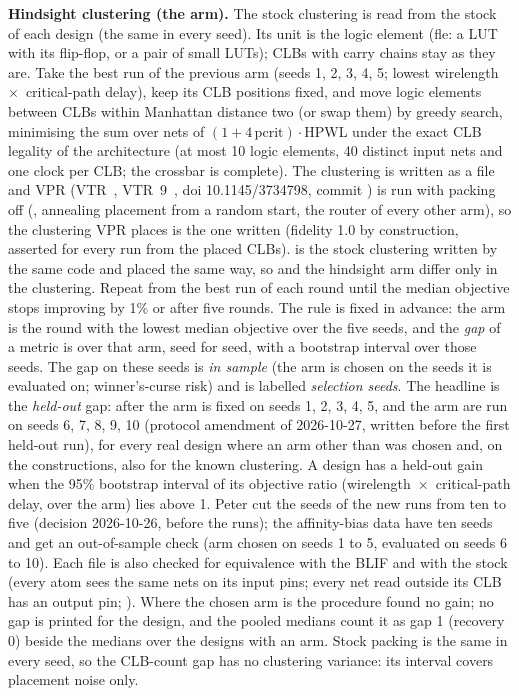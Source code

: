\textbf{Hindsight clustering (the  arm).} The stock clustering is read from the stock  of each design (the same in every seed). Its unit is the logic element
(fle: a LUT with its flip-flop, or a pair of small LUTs); CLBs with carry chains stay as they are. Take the best run of the previous arm
(seeds 1, 2, 3, 4, 5; lowest wirelength~$\times$~critical-path delay), keep its CLB positions fixed, and move logic elements between CLBs within Manhattan distance two
(or swap them) by greedy search, minimising the sum over nets of $(1+4\,\mathrm{pcrit})\cdot$HPWL under the exact CLB legality of the architecture
(at most 10 logic elements, 40 distinct input nets and one clock per CLB; the crossbar is complete). The clustering is written as a  file and VPR (VTR~\cite{rose2012vtr}, VTR~9~\cite{elgammal2025vtr9}, doi 10.1145/3734798, commit ) is run with packing off
(, annealing placement from a random start, the router of every other arm), so the clustering VPR places is the one written (fidelity 1.0 by construction, asserted for every run
from the placed CLBs).  is the stock clustering written by the same code and placed the same way, so  and the hindsight arm differ only in the clustering. Repeat from
the best run of each round until the median objective stops improving by 1\% or after five rounds. The rule is fixed in advance: the arm is the round with the lowest median objective over the five seeds, and the \emph{gap} of a metric is
 over that arm, seed for seed, with a bootstrap interval over those seeds. The gap on these seeds is \emph{in sample} (the arm is chosen on the seeds it is evaluated on; winner's-curse risk) and is labelled \emph{selection seeds}. The headline is the \emph{held-out} gap: after the arm is fixed on seeds 1, 2, 3, 4, 5,  and the arm are run on seeds 6, 7, 8, 9, 10 (protocol amendment of 2026-10-27, written before the first held-out run), for every real design where an arm other than  was chosen and, on the constructions, also for the known clustering. A design has a held-out gain when the 95\% bootstrap interval of its objective ratio (wirelength~$\times$~critical-path delay,  over the arm) lies above 1. Peter cut the seeds of the new runs from ten to five (decision 2026-10-26, before the  runs); the affinity-bias data have ten seeds and get an out-of-sample check (arm chosen on seeds 1 to 5, evaluated on seeds 6 to 10). Each  file is also checked for equivalence with the BLIF and with the stock  (every atom sees the same nets on its input pins; every net read outside its CLB has an output pin; ). Where the chosen arm is  the procedure found no gain; no gap is printed for the design, and the pooled medians count it as gap 1 (recovery 0) beside the medians over the designs with an arm. Stock packing is the
same in every seed, so the CLB-count gap has no clustering variance: its interval covers placement noise only.


